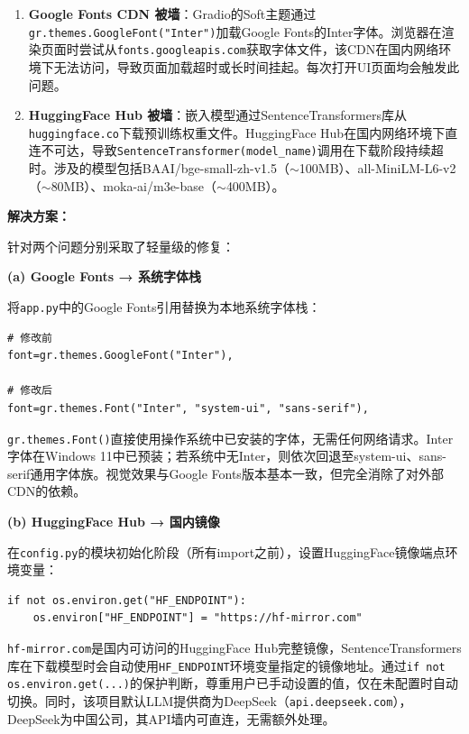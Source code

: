 \documentclass[10pt,a4paper]{article}
\begin{document}
\begin{enumerate}[label=(\arabic*)]
\item \textbf{Google Fonts CDN 被墙}：Gradio的Soft主题通过\texttt{gr.themes.GoogleFont("Inter")}加载Google Fonts的Inter字体。浏览器在渲染页面时尝试从\texttt{fonts.googleapis.com}获取字体文件，该CDN在国内网络环境下无法访问，导致页面加载超时或长时间挂起。每次打开UI页面均会触发此问题。
\item \textbf{HuggingFace Hub 被墙}：嵌入模型通过SentenceTransformers库从\texttt{huggingface.co}下载预训练权重文件。HuggingFace Hub在国内网络环境下直连不可达，导致\texttt{SentenceTransformer(model\_name)}调用在下载阶段持续超时。涉及的模型包括BAAI/bge-small-zh-v1.5（$\sim$100MB）、all-MiniLM-L6-v2（$\sim$80MB）、moka-ai/m3e-base（$\sim$400MB）。
\end{enumerate}

\textbf{解决方案：}

针对两个问题分别采取了轻量级的修复：

\textbf{(a) Google Fonts → 系统字体栈}

将\texttt{app.py}中的Google Fonts引用替换为本地系统字体栈：

\begin{verbatim}
# 修改前
font=gr.themes.GoogleFont("Inter"),

# 修改后
font=gr.themes.Font("Inter", "system-ui", "sans-serif"),
\end{verbatim}

\texttt{gr.themes.Font()}直接使用操作系统中已安装的字体，无需任何网络请求。Inter字体在Windows 11中已预装；若系统中无Inter，则依次回退至system-ui、sans-serif通用字体族。视觉效果与Google Fonts版本基本一致，但完全消除了对外部CDN的依赖。

\textbf{(b) HuggingFace Hub → 国内镜像}

在\texttt{config.py}的模块初始化阶段（所有import之前），设置HuggingFace镜像端点环境变量：

\begin{verbatim}
if not os.environ.get("HF_ENDPOINT"):
    os.environ["HF_ENDPOINT"] = "https://hf-mirror.com"
\end{verbatim}

\texttt{hf-mirror.com}是国内可访问的HuggingFace Hub完整镜像，SentenceTransformers库在下载模型时会自动使用\texttt{HF\_ENDPOINT}环境变量指定的镜像地址。通过\texttt{if not os.environ.get(...)}的保护判断，尊重用户已手动设置的值，仅在未配置时自动切换。同时，该项目默认LLM提供商为DeepSeek（\texttt{api.deepseek.com}），DeepSeek为中国公司，其API墙内可直连，无需额外处理。
\end{document}
